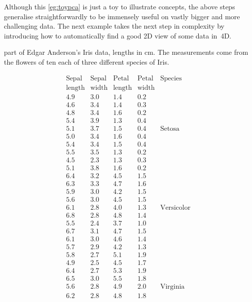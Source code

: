 Although this \autoref{eg:toypca} is just a toy to illustrate concepts, the above steps generalise straightforwardly to be immensely useful on vastly bigger and more challenging data.
The next example takes the next step in complexity by introducing how to automatically find a good 2D view of some data in~4D.





\begin{example} \label{eg:eaid}
\begin{table}
\caption{part of Edgar Anderson's Iris data, lengths in cm.  The measurements come from the flowers of ten each of three different species of Iris.}
\label{tbl:eaid}
\begin{equation*}
\begin{array}{rrrrl}
\hline
\text{Sepal}&\text{Sepal}&\text{Petal}&\text{Petal}&\text{Species}
\\\text{length}&\text{width}&\text{length}&\text{width}&
\\\hline
  4.9&3.0&1.4&0.2&
\\4.6&3.4&1.4&0.3&
\\4.8&3.4&1.6&0.2&
\\5.4&3.9&1.3&0.4&
\\5.1&3.7&1.5&0.4&\text{Setosa}
\\5.0&3.4&1.6&0.4&
\\5.4&3.4&1.5&0.4&
\\5.5&3.5&1.3&0.2&
\\4.5&2.3&1.3&0.3&
\\5.1&3.8&1.6&0.2&
\\\hline
  6.4&3.2&4.5&1.5&
\\6.3&3.3&4.7&1.6&
\\5.9&3.0&4.2&1.5&
\\5.6&3.0&4.5&1.5&
\\6.1&2.8&4.0&1.3&\text{Versicolor}
\\6.8&2.8&4.8&1.4&
\\5.5&2.4&3.7&1.0&
\\6.7&3.1&4.7&1.5&
\\6.1&3.0&4.6&1.4&
\\5.7&2.9&4.2&1.3&
\\\hline
  5.8&2.7&5.1&1.9&
\\4.9&2.5&4.5&1.7&
\\6.4&2.7&5.3&1.9&
\\6.5&3.0&5.5&1.8&
\\5.6&2.8&4.9&2.0&\text{Virginia}
\\6.2&2.8&4.8&1.8&

\end{array}
\end{equation*}
\end{table}
\end{example}
